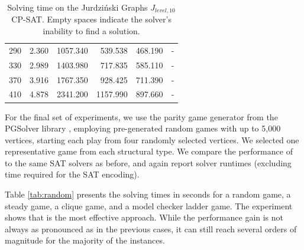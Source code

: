 \documentclass[a4paper,UKenglish,cleveref, autoref, thm-restate, anonymous]{lipics-v2021}
\begin{document}
\begin{table}
\begin{tabular}{rrrrrr}
        290 & 2.360  & 1057.340 & 539.538 & 468.190 & -       \\
        330 & 2.989  & 1403.980 & 717.835 & 585.110 & -       \\
        370 & 3.916  & 1767.350 & 928.425 & 711.390 & -       \\
        410 & 4.878  & 2341.200 & 1157.990 & 897.660 & -       \\
        \hline
    \end{tabular}
    \caption{Solving time on the Jurdziński Graphs $J_{level,10}$ CP-SAT. Empty spaces indicate the solver's inability to find a solution.}
    \label{tab:cp-sat}
\end{table}

For the final set of experiments, we use the parity game generator from the PGSolver library \cite{Friedmann:2017}, employing pre-generated random games with up to 5,000 vertices, starting each play from four randomly selected vertices. We selected one representative game from each structural type. We compare the performance of \noc to the same SAT solvers as before, and again report solver runtimes (excluding time required for the SAT encoding).

Table \ref{tab:random} presents the solving times in seconds for a random game, a steady game, a clique game, and a model checker ladder game. The experiment shows that \noc is the most effective approach. While the performance gain is not always as pronounced as in the previous cases, it can still reach several orders of magnitude for the majority of the instances.

\end{document}
